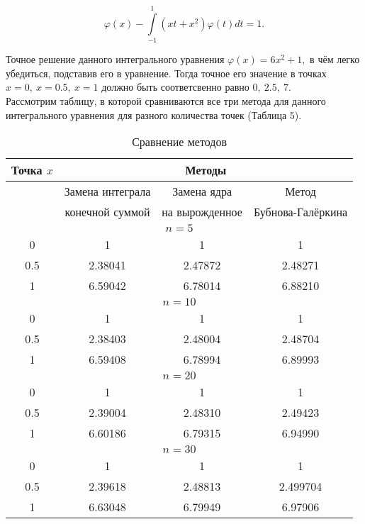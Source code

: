 \documentclass[12pt]{article}
\begin{document}
$$\varphi(x) - \int\limits_{-1}^{1} (xt + x^2)\varphi(t)dt = 1.$$

Точное решение данного интегрального уравнения $ \varphi(x) = 6x^2 + 1 ,$ в чём легко убедиться, подставив его в уравнение. Тогда точное его значение в точках $ x = 0, \: x = 0.5, \: x = 1 $ должно быть соответсвенно равно $ 0, \: 2.5, \:  7. $\\

Рассмотрим таблицу, в которой сравниваются все три метода для данного интегрального уравнения для разного количества точек (Таблица 5).\\

\newpage
\renewcommand{\arraystretch}{1.5} %
\renewcommand{\tabcolsep}{0.1cm}   %
\begin{table}[h!]
	\caption{\label{tab:canonsummary} Сравнение методов}
	\begin{center}
		\begin{tabular}{|c|c|c|c|}
			\hline
			Точка $ x $ & \multicolumn{3}{|c|}{Методы} \\
			\hline
			& Замена интеграла& Замена ядра& Метод\\
			& конечной суммой & на вырожденное & Бубнова-Галёркина\\			 
			\hline
			\multicolumn{4}{|c|}{$ n = 5 $} \\
			\hline
			0 & 1 & 1 & 1 \\
			\hline
			0.5 & 2.38041 & 2.47872 & 2.48271 \\
			\hline
			1 & 6.59042 & 6.78014 & 6.88210 \\
			\hline
			\multicolumn{4}{|c|}{$ n = 10 $} \\
			\hline
			0 & 1 & 1 & 1 \\
			\hline
			0.5 & 2.38403 & 2.48004 & 2.48704 \\
			\hline
			1 & 6.59408 & 6.78994 & 6.89993 \\
			\hline
			\multicolumn{4}{|c|}{$ n = 20 $} \\
			\hline
			0 & 1 & 1 & 1 \\
			\hline
			0.5 & 2.39004 & 2.48310 & 2.49423 \\
			\hline
			1 & 6.60186 & 6.79315 & 6.94990 \\
			\hline
			\multicolumn{4}{|c|}{$ n = 30 $} \\
			\hline
			0 & 1 & 1 & 1 \\
			\hline
			0.5 & 2.39618 & 2.48813 & 2.499704 \\
			\hline
			1 & 6.63048 & 6.79949 & 6.97906 \\						
			\hline
		\end{tabular}
	\end{center}
\end{table} 
\end{document}
